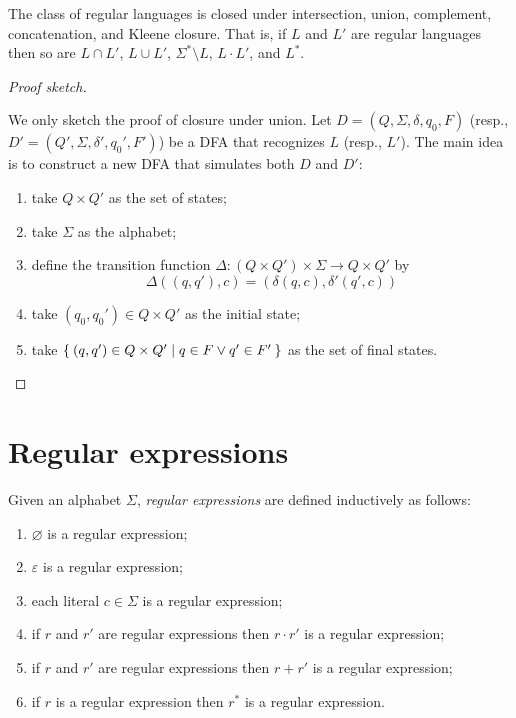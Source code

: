 \documentclass{zett}
\begin{document}
\begin{thm}\label{thm:regular-closure}
  The class of regular languages is closed under intersection, union, complement, concatenation, and Kleene closure.
  That is, if $L$ and $L'$ are regular languages then so are $L \cap L'$, $L \cup L'$, $\Sigma^{*} \setminus L$, $L \cdot L'$, and $L^{*}$.
\end{thm}
\begin{proof}[Proof sketch]
  \begin{node}\label{node:tensor-of-dfa}%
    We only sketch the proof of closure under union.
    Let $D = (Q, \Sigma, \delta, q_{0}, F)$ (resp., $D' = (Q', \Sigma, \delta', q_{0}', F')$) be a DFA that recognizes $L$ (resp., $L'$).
    The main idea is to construct a new DFA that simulates both $D$ and $D'$:
    \begin{enumerate}
    \item take $Q \times Q'$ as the set of states;
    \item take $\Sigma$ as the alphabet;
    \item define the transition function $\Delta : (Q \times Q') \times \Sigma \to Q \times Q'$ by
      $$
      \Delta((q, q'), c) = (\delta(q, c), \delta'(q', c))
      $$
    \item take $(q_{0}, q_{0}') \in Q \times Q'$ as the initial state;
    \item take $\Set{(q, q') \in Q \times Q' \mid q \in F \vee q' \in F'}$ as the set of final states.
    \end{enumerate}
  \end{node}
\end{proof}

\section{Regular expressions}
\label{sec:regex}

\begin{defn}
  Given an alphabet $\Sigma$, \emph{regular expressions} are defined inductively as follows:
  \begin{enumerate}
  \item $\varnothing$ is a regular expression;
  \item $\varepsilon$ is a regular expression;
  \item each literal $c \in \Sigma$ is a regular expression;
  \item if $r$ and $r'$ are regular expressions then $r \cdot r'$ is a regular expression;
  \item if $r$ and $r'$ are regular expressions then $r + r'$ is a regular expression;
  \item if $r$ is a regular expression then $r^{*}$ is a regular expression.
  \end{enumerate}
\end{defn}
\end{document}
